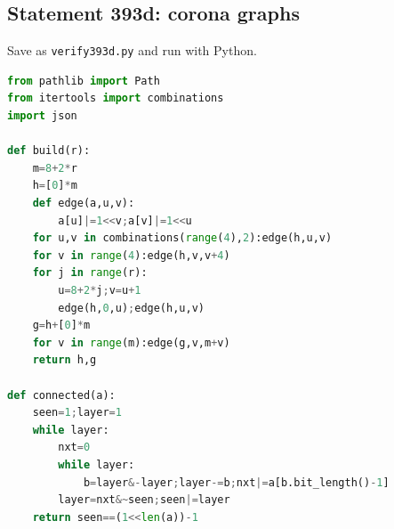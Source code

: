 \documentclass[11pt,a4paper]{article}
\theoremstyle{remark}
\begin{document}
\subsection{Statement 393d: corona graphs}
Save as \texttt{verify393d.py} and run with Python.
\begin{lstlisting}[language=Python]
from pathlib import Path
from itertools import combinations
import json

def build(r):
    m=8+2*r
    h=[0]*m
    def edge(a,u,v):
        a[u]|=1<<v;a[v]|=1<<u
    for u,v in combinations(range(4),2):edge(h,u,v)
    for v in range(4):edge(h,v,v+4)
    for j in range(r):
        u=8+2*j;v=u+1
        edge(h,0,u);edge(h,u,v)
    g=h+[0]*m
    for v in range(m):edge(g,v,m+v)
    return h,g

def connected(a):
    seen=1;layer=1
    while layer:
        nxt=0
        while layer:
            b=layer&-layer;layer-=b;nxt|=a[b.bit_length()-1]
        layer=nxt&~seen;seen|=layer
    return seen==(1<<len(a))-1


\end{lstlisting}
\end{document}
